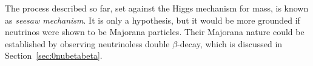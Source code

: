 The process described so far, set against the Higgs mechanism for mass, is known as \textit{seesaw mechanism}.
It is only a hypothesis, but it would be more grounded if neutrinos were shown to be Majorana particles.
Their Majorana nature could be established by observing neutrinoless double $\beta$-decay, which is discussed in Section~\ref{sec:0nubetabeta}.